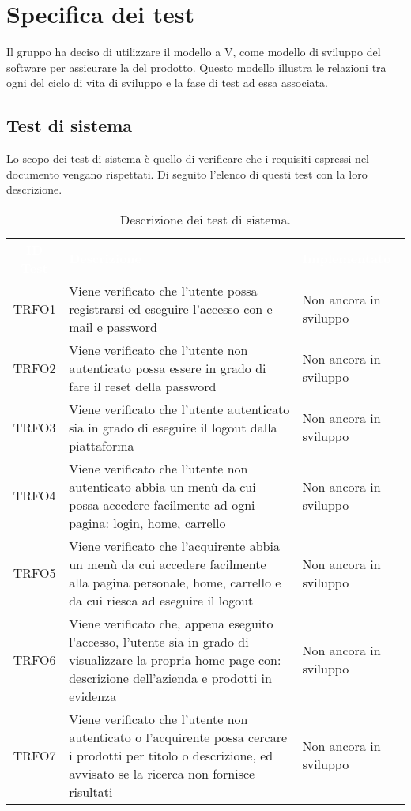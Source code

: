 \section{Specifica dei test}
\label{specificatest}
Il gruppo ha deciso di utilizzare il modello a V, come modello di sviluppo del software per assicurare la  del prodotto. Questo modello illustra le relazioni tra ogni  del ciclo di vita di sviluppo e la fase di test ad essa associata.
\subsection{Test di sistema}
Lo scopo dei test di sistema è quello di verificare che i requisiti espressi nel documento \AdR{} vengano rispettati. Di seguito l'elenco di questi test con la loro descrizione.
\begin{longtable}{|c| C{10cm} |C{3cm}|}
	\caption{\label{tab:TestSistema1}Descrizione dei test di sistema.}\\
	\textcolor{white}{\textbf{ID Test}}&
	\textcolor{white}{\textbf{Descrizione}}&
	\textcolor{white}{\textbf{Implementato}}\\
	TRFO1 & Viene verificato che l'utente possa registrarsi ed eseguire l'accesso con e-mail e password & Non ancora in sviluppo\\ \hline
	TRFO2 & Viene verificato che l'utente non autenticato possa essere in grado di fare il reset della password & Non ancora in sviluppo\\ \hline
	TRFO3 & Viene verificato che l'utente autenticato sia in grado di eseguire il logout dalla piattaforma & Non ancora in sviluppo\\ \hline
	TRFO4 & Viene verificato che l'utente non autenticato abbia un menù da cui possa accedere facilmente ad ogni pagina: login, home, carrello & Non ancora in sviluppo\\ \hline
	TRFO5 & Viene verificato che l'acquirente abbia un menù da cui accedere facilmente alla pagina personale, home, carrello e da cui riesca ad eseguire il logout & Non ancora in sviluppo\\ \hline
	TRFO6 & Viene verificato che, appena eseguito l'accesso, l'utente sia in grado di visualizzare la propria home page con: descrizione dell'azienda e prodotti in evidenza & Non ancora in sviluppo\\ \hline
	TRFO7 & Viene verificato che l'utente non autenticato o l'acquirente possa cercare i prodotti per titolo o descrizione, ed avvisato se la ricerca non fornisce risultati & Non ancora in sviluppo\\ \hline

\end{longtable}
